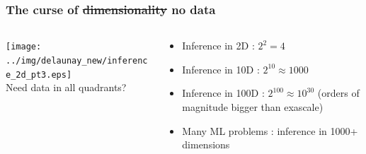 \documentclass[aspectratio=169]{beamer}
\begin{document}
\begin{frame}
\frametitle{The curse of \sout{dimensionality} no data}

\begin{columns}
\begin{column}{0.5\textwidth}
\begin{center}
\texttt{[image: ../img/delaunay\_new/inference\_2d\_pt3.eps]}\\
Need data in all quadrants?
\end{center}
\end{column}

\begin{column}{0.5\textwidth}
\pause
\begin{itemize}
\item Inference in 2D : $2^2 = 4$
\item Inference in 10D : $2^{10} \approx 1000$
\item Inference in 100D : $2^{100} \approx 10^{30}$ (orders of magnitude bigger than exascale)
\item Many ML problems : inference in 1000+ dimensions
\end{itemize}
\end{column}
\end{columns}

\end{frame}

%
%
%
%
%
%
%
%
%
\end{document}

